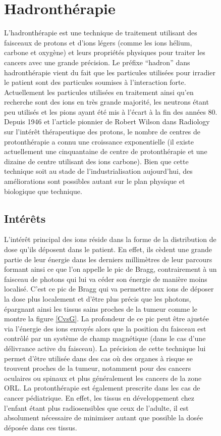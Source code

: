\documentclass[11pt,a4paper,oldfontcommands]{memoir}
\begin{document}
\begin{figure}
\openany
\section{Hadronthérapie}
L'hadronthérapie est une technique de traitement utilisant des faisceaux de protons et d'ions légers (comme les ions hélium, carbone et oxygène) et leurs propriétés physiques pour traiter les cancers avec une grande précision. Le préfixe \enquote{hadron} dans hadronthérapie vient du fait que les particules utilisées pour irradier le patient sont des particules soumises à l'interaction forte. Actuellement les particules utilisées en traitement ainsi qu'en recherche sont des ions en très grande majorité, les neutrons étant peu utilisés et les pions ayant été mis à l'écart à la fin des années 80. Depuis 1946 et l'article pionnier de Robert Wilson dans Radiology\cite{wilson} sur l'intérêt thérapeutique des protons, le nombre de centres de protonthérapie a connu une croissance exponentielle (il existe actuellement une cinquantaine de centre de protonthérapie et une dizaine de centre utilisant des ions carbone). Bien que cette technique soit au stade de l'industrialisation aujourd'hui, des améliorations sont possibles autant sur le plan physique et biologique que technique. 
\subsection{Intérêts}
L'intérêt principal des ions réside dans la forme de la distribution de dose qu'ils déposent dans le patient. En effet, ils cèdent une grande partie de leur énergie dans les derniers millimètres de leur parcours formant ainsi ce que l'on appelle le pic de Bragg, contrairement à un faisceau de photons qui lui va céder son énergie de manière moins localisé. C'est ce pic de Bragg qui va permettre aux ions de déposer la dose plus localement et d'être plus précis que les photons, épargnant ainsi les tissus sains proches de la tumeur comme le montre la figure \ref{CvsG}. La profondeur de ce pic peut être ajustée via l'énergie des ions envoyés alors que la position du faisceau est contrôlé par un système de champ magnétique (dans le cas d'une délivrance active du faisceau). La précision de cette technique lui permet d'être utilisée dans des cas où des organes à risque se trouvent proches de la tumeur, notamment pour des cancers oculaires ou spinaux et plus généralement les cancers de la zone ORL. La protonthérapie est également prescrite dans les cas de cancer pédiatrique. En effet, les tissus en développement chez l'enfant étant plus radiosensibles que ceux de l'adulte, il est absolument nécessaire de minimiser autant que possible la dosée déposée dans ces tissus. \\


\end{figure}
\end{document}
